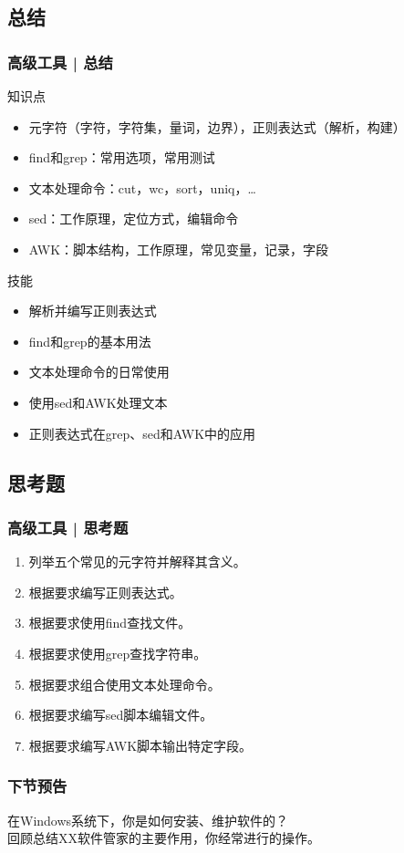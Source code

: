 \subsection{总结}
\begin{frame}
  \frametitle{高级工具 | 总结}
  \begin{block}{知识点}
    \begin{itemize}
      \item 元字符（字符，字符集，量词，边界），正则表达式（解析，构建）
      \item find和grep：常用选项，常用测试
      \item 文本处理命令：cut，wc，sort，uniq，\ldots
      \item sed：工作原理，定位方式，编辑命令
      \item AWK：脚本结构，工作原理，常见变量，记录，字段
    \end{itemize}
  \end{block}
  \begin{block}{技能}
    \begin{itemize}
      \item 解析并编写正则表达式
      \item find和grep的基本用法
      \item 文本处理命令的日常使用
      \item 使用sed和AWK处理文本
      \item 正则表达式在grep、sed和AWK中的应用
    \end{itemize}
  \end{block}
\end{frame}

\subsection{思考题}
\begin{frame}
  \frametitle{高级工具 | 思考题}
  \begin{enumerate}
    \item 列举五个常见的元字符并解释其含义。
    \item 根据要求编写正则表达式。
    \item 根据要求使用find查找文件。
    \item 根据要求使用grep查找字符串。
    \item 根据要求组合使用文本处理命令。
    \item 根据要求编写sed脚本编辑文件。
    \item 根据要求编写AWK脚本输出特定字段。
  \end{enumerate}
\end{frame}

\begin{frame}
  \frametitle{下节预告}
   在Windows系统下，你是如何安装、维护软件的？\\
   回顾总结XX软件管家的主要作用，你经常进行的操作。
\end{frame}





